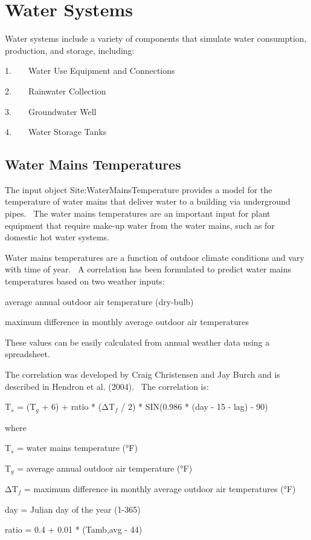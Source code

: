 \section{Water Systems }\label{water-systems}

Water systems include a variety of components that simulate water consumption, production, and storage, including:

1.~~~~Water Use Equipment and Connections

2.~~~~Rainwater Collection

3.~~~~Groundwater Well

4.~~~~Water Storage Tanks

\subsection{Water Mains Temperatures}\label{water-mains-temperatures}

The input object Site:WaterMainsTemperature provides a model for the temperature of water mains that deliver water to a building via underground pipes.~ The water mains temperatures are an important input for plant equipment that require make-up water from the water mains, such as for domestic hot water systems.

Water mains temperatures are a function of outdoor climate conditions and vary with time of year.~ A correlation has been formulated to predict water mains temperatures based on two weather inputs:

average annual outdoor air temperature (dry-bulb)

maximum difference in monthly average outdoor air temperatures

These values can be easily calculated from annual weather data using a spreadsheet.

The correlation was developed by Craig Christensen and Jay Burch and is described in Hendron et al. (2004).~ The correlation is:

T\(_{s}\) = (T\(_{g}\) + 6) + ratio * (ΔT\(_{f}\) / 2) * SIN(0.986 * (day - 15 - lag) - 90)

where

T\(_{s}\) = water mains temperature (°F)

T\(_{g}\) = average annual outdoor air temperature (°F)

ΔT\(_{f}\) = maximum difference in monthly average outdoor air temperatures (°F)

day = Julian day of the year (1-365)

ratio = 0.4 + 0.01 * (Tamb,avg - 44)

